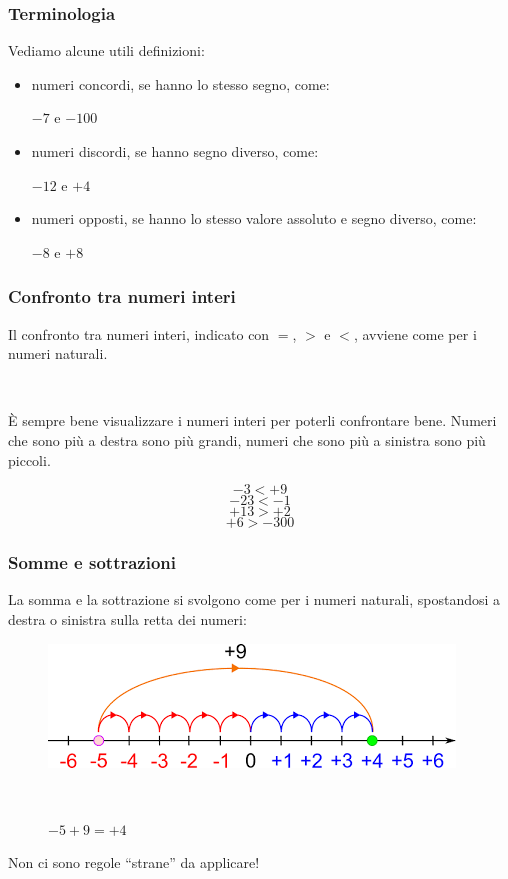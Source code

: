 \documentclass[handout]{beamer}
\theoremstyle{plain}
\begin{document}
\begin{frame}
\frametitle{Terminologia}
Vediamo alcune utili definizioni:
\begin{itemize}
  \item \alert{numeri concordi}, se hanno lo stesso segno, come:
  \begin{center}
    $ -7 $ e $ -100 $
  \end{center}\pause
  \item \alert{numeri discordi}, se hanno segno diverso, come:
  \begin{center}
    $ -12 $ e $ +4 $
  \end{center}\pause
  \item \alert{numeri opposti}, se hanno lo stesso valore assoluto e segno diverso, come:
  \begin{center}
    $ -8 $ e $ +8 $
  \end{center}
\end{itemize}
\end{frame}


\begin{frame}
\frametitle{Confronto tra numeri interi}
Il confronto tra numeri interi, indicato con $ = $, $ > $ e $ < $, avviene come per i numeri naturali.\pause

~

È sempre bene \alert{visualizzare i numeri interi} per poterli confrontare bene. Numeri che sono più a destra sono più grandi, numeri che sono più a sinistra sono più piccoli.\pause

\[ -3 < +9 \]\pause
\[ -23 < -1 \]\pause
\[ +13 > +2\]\pause
\[ +6 > -300 \]
\end{frame}

\begin{frame}
\frametitle{Somme e sottrazioni}
\alert{La somma e la sottrazione si svolgono come per i numeri naturali}, spostandosi a destra o sinistra sulla retta dei numeri:

\begin{figure}
  \includegraphics[width=.8\columnwidth]{img/sommainteri.png}

  ~

  $ -5 + 9 = +4 $
\end{figure}\pause

Non ci sono regole ``strane'' da applicare!
\end{frame}
\end{document}
